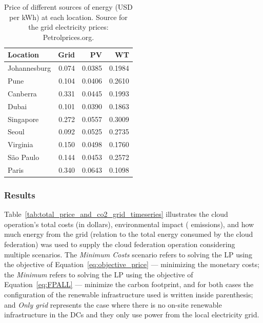 \begin{table}[h]
  
  \caption{Price of different sources of energy (USD per kWh) at each location. Source for the grid electricity prices: Petrolprices.org.  }\label{tab:price_electricity_sources} \centering
  
  \begin{tabular}{|l|r|r|r|}
  \hline    
  \textbf{Location} &   \textbf{Grid} & \textbf{PV} & \textbf{WT} \\
  \hline
  Johannesburg & 0.074 & 0.0385 &  0.1984   \\
  \hline
  Pune      &  0.104   & 0.0406 & 0.2610    \\
  \hline
  Canberra  & 0.331    &  0.0445 & 0.1993   \\
  \hline
  Dubai   & 0.101      & 0.0390 &   0.1863  \\
  \hline
  Singapore & 0.272    & 0.0557 & 0.3009    \\
  \hline     
  Seoul      & 0.092   & 0.0525 & 0.2735    \\
  \hline
  Virginia   & 0.150   &  0.0498 &  0.1760  \\
  \hline
  São Paulo  & 0.144   &  0.0453 & 0.2572   \\
  \hline 
  Paris      & 0.340   &  0.0643 & 0.1098   \\
  \hline  

\end{tabular}
\end{table}

\subsubsection{Results}

Table~\ref{tab:total_price_and_co2_grid_timeseries} illustrates the cloud operation's total costs (in dollars), environmental impact ( emissions), and how much energy from the grid (relation to the total energy consumed by the cloud federation) was used to supply the cloud federation operation considering multiple scenarios. The \textit{Minimum Costs} scenario refers to solving the LP using the objective of Equation~\eqref{eq:objective_price} --- minimizing the monetary costs; the \textit{Minimum } refers to solving the LP using the objective of Equation~\eqref{eq:FPALL} --- minimize the carbon footprint, and for both cases the configuration of the renewable infrastructure used is written inside parenthesis; and \textit{Only grid} represents the case where there is no on-site renewable infrastructure in the DCs and they only use power from the local electricity grid.

